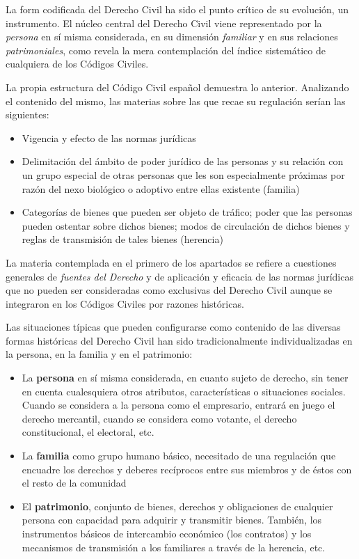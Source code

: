 \documentclass[a4paper,12pt]{report}
\begin{document}
La form codificada del Derecho Civil ha sido el punto crítico de su evolución,
un instrumento. El núcleo central del Derecho Civil viene representado por la
\emph{persona} en sí misma considerada, en su dimensión \emph{familiar} y en sus relaciones
\emph{patrimoniales}, como revela la mera contemplación del índice sistemático
de cualquiera de los Códigos Civiles.

La propia estructura del Código Civil español demuestra lo anterior. Analizando
el contenido del mismo, las materias sobre las que recae su regulación serían
las siguientes:

\begin{itemize}
    \item{Vigencia y efecto de las normas jurídicas}
    \item{Delimitación del ámbito de poder jurídico de las personas y su
        relación con un grupo especial de otras personas que les son
    especialmente próximas por razón del nexo biológico o adoptivo entre ellas
existente (familia)}
    \item{Categorías de bienes que pueden ser objeto de tráfico; poder que las
        personas pueden ostentar sobre dichos bienes; modos de circulación de
    dichos bienes y reglas de transmisión de tales bienes (herencia)}
\end{itemize}

La materia contemplada en el primero de los apartados se refiere a cuestiones
generales de \textit{fuentes del Derecho} y de aplicación y eficacia de las
normas jurídicas que no pueden ser consideradas como exclusivas del Derecho
Civil aunque se integraron en los Códigos Civiles por razones históricas.

Las situaciones típicas que pueden configurarse como contenido de las diversas
formas históricas del Derecho Civil han sido tradicionalmente individualizadas
en la persona, en la familia y en el patrimonio:

\begin{itemize}
    \item{La \textbf{persona} en sí misma considerada, en cuanto sujeto de
        derecho, sin tener en cuenta cualesquiera otros atributos,
    características o situaciones sociales. Cuando se considera a la persona
como el empresario, entrará en juego el derecho mercantil, cuando se considera
como votante, el derecho constitucional, el electoral, etc.}
    \item{La \textbf{familia} como grupo humano básico, necesitado de una
        regulación que encuadre los derechos y deberes recíprocos entre sus
    miembros y de éstos con el resto de la comunidad}
    \item{El \textbf{patrimonio}, conjunto de bienes, derechos y obligaciones de
        cualquier persona con capacidad para adquirir y transmitir bienes.
    También, los instrumentos básicos de intercambio económico (los contratos) y
los mecanismos de transmisión a los familiares a través de la herencia, etc.}
\end{itemize}
\end{document}
